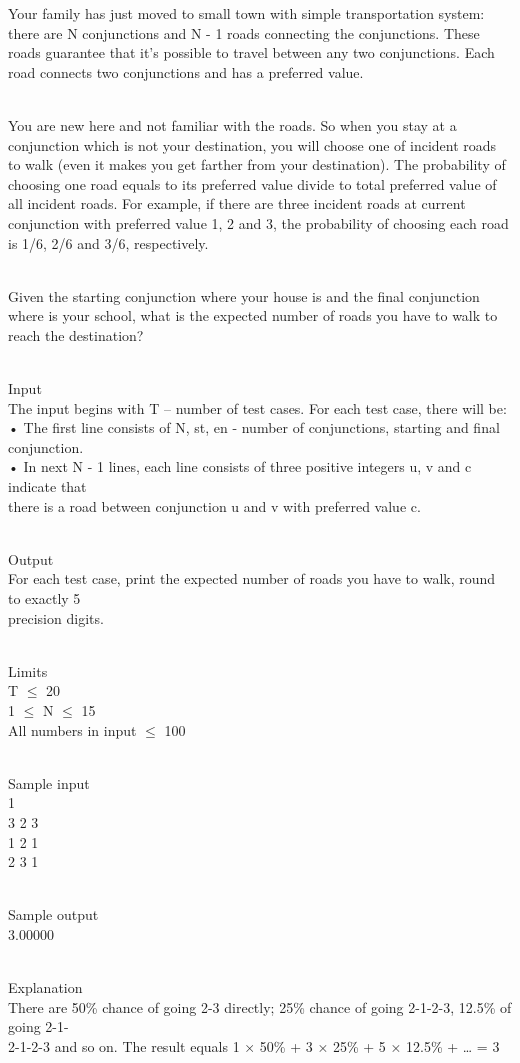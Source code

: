 



   Your family has just moved to small town with simple transportation system: there are N conjunctions and N - 1 roads connecting the conjunctions. These roads guarantee that it’s possible to travel between any two conjunctions. Each road connects two conjunctions and has a preferred value.  


\\   You are new here and not familiar with the roads. So when you stay at a conjunction which is not your destination, you will choose one of incident roads to walk (even it makes you get farther from your destination). The probability of choosing one road equals to its preferred value divide to total preferred value of all incident roads. For example, if there are three incident roads at current conjunction with preferred value 1, 2 and 3, the probability of choosing each road is 1/6, 2/6 and 3/6, respectively.  


\\   Given the starting conjunction where your house is and the final conjunction where is your school, what is the expected number of roads you have to walk to reach the destination?  


\\   Input   
\\   The input begins with T – number of test cases. For each test case, there will be:   
\\   • The first line consists of N, st, en - number of conjunctions, starting and final   
\\   conjunction.   
\\   • In next N - 1 lines, each line consists of three positive integers u, v and c indicate that   
\\   there is a road between conjunction u and v with preferred value c.  


\\   Output   
\\   For each test case, print the expected number of roads you have to walk, round to exactly 5   
\\   precision digits.  


\\   Limits   
\\   T  $\le$  20   
\\   1  $\le$  N  $\le$  15   
\\   All numbers in input  $\le$  100  


\\   Sample input   
\\   1   
\\   3 2 3   
\\   1 2 1   
\\   2 3 1  


\\   Sample output   
\\   3.00000  


\\   Explanation   
\\   There are 50\% chance of going 2-3 directly; 25\% chance of going 2-1-2-3, 12.5\% of going 2-1-   
\\   2-1-2-3 and so on. The result equals 1 × 50\% + 3 × 25\% + 5 × 12.5\% + … = 3  
